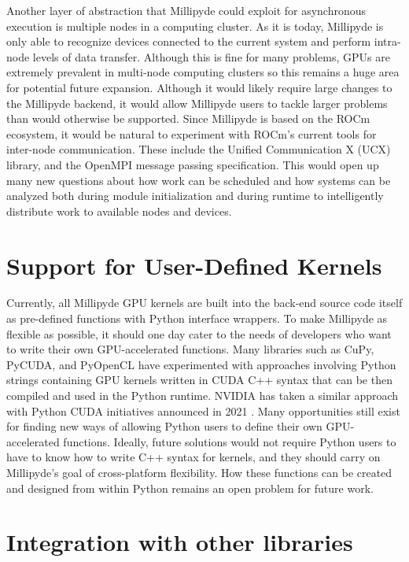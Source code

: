 Another layer of abstraction that Millipyde could exploit for asynchronous execution is multiple nodes in a computing cluster. As it is today, Millipyde is only able to recognize devices connected to the current system and perform intra-node levels of data transfer. Although this is fine for many problems, GPUs are extremely prevalent in multi-node computing clusters so this remains a huge area for potential future expansion. Although it would likely require large changes to the Millipyde backend, it would allow Millipyde users to tackle larger problems than would otherwise be supported. Since Millipyde is based on the ROCm ecosystem, it would be natural to experiment with ROCm's current tools for inter-node communication. These include the Unified Communication X (UCX) library, and the OpenMPI message passing specification. This would open up many new questions about how work can be scheduled and how systems can be analyzed both during module initialization and during runtime to intelligently distribute work to available nodes and devices. 

\section{Support for User-Defined Kernels}

Currently, all Millipyde GPU kernels are built into the back-end source code itself as pre-defined functions with Python interface wrappers. To make Millipyde as flexible as possible, it should one day cater to the needs of developers who want to write their own GPU-accelerated functions. Many libraries such as CuPy, PyCUDA, and PyOpenCL have experimented with approaches involving Python strings containing GPU kernels written in CUDA C++ syntax that can be then compiled and used in the Python runtime. NVIDIA has taken a similar approach with Python CUDA initiatives announced in 2021 \cite{cudaPython}. Many opportunities still exist for finding new ways of allowing Python users to define their own GPU-accelerated functions. Ideally, future solutions would not require Python users to have to know how to write C++ syntax for kernels, and they should carry on Millipyde's goal of cross-platform flexibility. How these functions can be created and designed from within Python remains an open problem for future work.

\section{Integration with other libraries}


